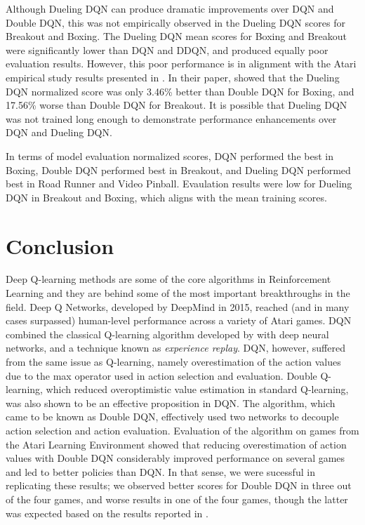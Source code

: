 \documentclass{article}
\begin{document}
Although Dueling DQN can produce dramatic improvements over DQN and Double DQN,
this was not empirically observed in the Dueling DQN scores for Breakout and
Boxing. The Dueling DQN mean scores for Boxing and Breakout were significantly
lower than DQN and DDQN, and produced equally poor evaluation results.  However,
this poor performance is in alignment with the Atari empirical study results
presented in \cite{wang2016dueling}. In their paper, \cite{wang2016dueling}
showed that the Dueling DQN normalized score was only 3.46\% better than Double
DQN for Boxing, and 17.56\% worse than Double DQN for Breakout. It is possible
that Dueling DQN was not trained long enough to demonstrate performance
enhancements over DQN and Dueling DQN.

In terms of model evaluation normalized scores, DQN performed the best in
Boxing, Double DQN performed best in Breakout, and Dueling DQN performed best in
Road Runner and Video Pinball. Evaulation results were low for Dueling DQN in
Breakout and Boxing, which aligns with the mean training scores.

\section{Conclusion}
Deep Q-learning methods are some of the core algorithms in Reinforcement
Learning and they are behind some of the most important breakthroughs in the
field. Deep Q Networks, developed by DeepMind in 2015, reached (and in many
cases surpassed) human-level performance across a variety of Atari games. DQN
combined the classical Q-learning algorithm developed by
\cite{watkins1989learning} with deep neural networks, and a technique known as
\emph{experience replay}. DQN, however, suffered from the same issue as
Q-learning, namely overestimation of the action values due to the max operator
used in action selection and evaluation. Double Q-learning, which reduced
overoptimistic value estimation in standard Q-learning, was also shown to be an
effective proposition in DQN. The algorithm, which came to be known as Double
DQN, effectively used two networks to decouple action selection and action
evaluation. Evaluation of the algorithm on games from the Atari Learning
Environment showed that reducing overestimation of action values with Double DQN
considerably improved performance on several games and led to better policies
than DQN. In that sense, we were sucessful in replicating these results; we
observed better scores for Double DQN in three out of the four games, and worse
results in one of the four games, though the latter was expected based on the
results reported in \cite{van2016deep}.
\end{document}
